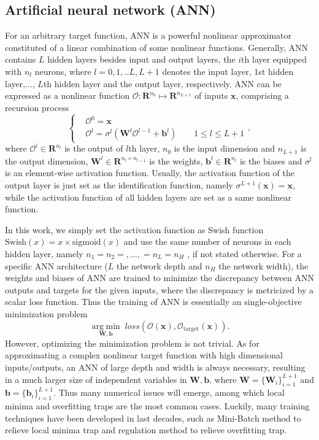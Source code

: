 \documentclass[preprint, 10pt]{elsarticle}
\begin{document}
\subsection{Artificial neural network (ANN) }
For an arbitrary target function, ANN is a powerful nonlinear approximator constituted of a linear combination of some nonlinear functions. Generally, ANN contains $L$ hidden layers besides input and output layers,  the $i$th layer equipped with $n_l$ neurons, where $l=0,1,..L,L+1$ denotes the input layer, 1st hidden layer,..., $L$th hidden layer and the output layer, respectively. ANN can be expressed as a nonlinear function $\mathcal{O}: \mathbf{R}^{n_0} \mapsto \mathbf{R}^{n_{L+1}}$ of inputs $\mathbf{x}$, comprising a  recursion process
\begin{equation}
\left \{
\begin{aligned}
&\mathcal{O}^{0}   = \mathbf{x} \\
&\mathcal{O}^{l}   = \sigma ^{l} \left( \mathbf{W}^{l} \mathcal{O}^{l-1} + \mathbf{b}^{l}
\right)
\qquad 1 \le l \le L+1
\end{aligned}
\right. ,
\end{equation}
where $\mathcal{O}^{l} \in \mathbf{R}^{n_l}$ is the output of $l$th layer, $n_0$ is the input dimension and $n_{L+1}$ is the output dimension, $\mathbf{W}^{l} \in \mathbf{R}^{n_{l} \times n_{l-1}}$ is the weights, $\mathbf{b}^{l} \in \mathbf{R}^{n_l}$ is the biases and $\sigma ^{l}$ is an element-wise activation function. Usually, the activation function of the output layer is just set as the identification function, namely $\sigma ^{L+1}\left(\mathbf{x}\right)=\mathbf{x}$, while the activation function of all hidden layers are set as a same nonlinear function.

In this work, we simply set the activation function as Swish function \cite{ramachandran2017searching} $ \text{Swish}(x) =x \times \text{sigmoid}(x)$ and use the same number of neurons in each hidden layer, namely $n_1=n_2=,...,=n_L=n_H$ , if not stated otherwise. For a specific ANN architecture ($L$ the network depth and $n_H$ the network width), the weights and biases of ANN are trained to minimize the discrepancy between ANN outputs and targets for the given inputs, where the discrepancy is metricized by a scalar loss function. Thus the training of ANN is essentially an single-objective minimization problem
\begin{equation}
\mathop {\arg \;\min }\limits_{{\mathbf{W,b}}} \;
loss\left( {\mathcal{O}\left(\mathbf{x}\right),\mathcal{O}_\text{target} \left(\mathbf{x}\right)} \right)
.
\end{equation}
However, optimizing the minimization problem is not trivial. As for approximating a complex nonlinear target function with high dimensional inputs/outputs, an ANN of large depth and width is always necessary, resulting in a much larger size of independent variables in $\mathbf{W,b}$, where $\mathbf{W}=\{\mathbf{W}_i\}_{i=1}^{L+1}$ and $\mathbf{b}=\{\mathbf{b}_i\}_{i=1}^{L+1}$. Thus many numerical issues will emerge, among which local minima and overfitting traps are the most common cases. Luckily, many training techniques have been developed in last decades, such as Mini-Batch method to relieve local minima trap and regulation method to relieve overfitting trap.
\end{document}
